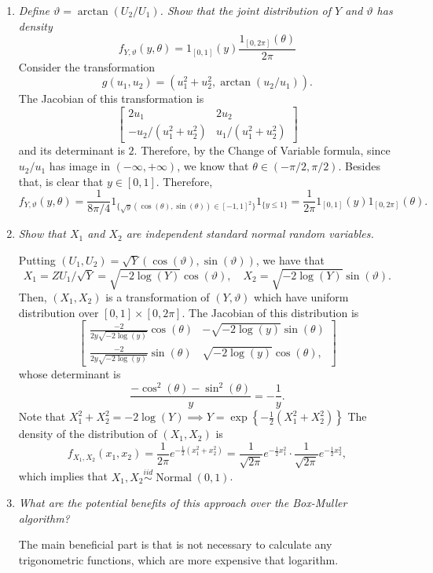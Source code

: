 \documentclass[a4paper,12pt]{article}
\theoremstyle{definition}
\begin{document}
\begin{enumerate}
    \item {\it Define $\vartheta = \arctan(U_2/U_1)$. Show that the joint
    distribution of $Y$ and $\vartheta$ has density 
    $$
    f_{Y, \vartheta}(y,\theta) = 1_{[0,1]}(y)\frac{1_{[0,2\pi]}(\theta)}{2\pi}
    $$}
    Consider the transformation
    $$
    g(u_1, u_2) = \left(u_1^2 + u_2^2, \arctan(u_2/u_1)\right).
    $$ 
    The Jacobian of this transformation is 
    $$
    \begin{bmatrix}
        2u_1 & 2u_2 \\ 
        -u_2/(u_1^2 + u_2^2) & u_1/(u_1^2 + u_2^2)
    \end{bmatrix}
    $$
    and its determinant is $2$. Therefore, by the Change of Variable formula,
    since $u_2/u_1$ has image in $(-\infty, +\infty)$, we know that $\theta \in (-\pi/2,
    \pi/2)$. Besides that, is clear that $y \in [0,1]$. Therefore, 
    $$
    f_{Y, \vartheta}(y,\theta) = \frac{1}{8\pi/4}1_{\{\sqrt{y}(\cos(\theta), \sin(\theta)) \in [-1,1]^2\}}1_{\{y \le 1\}} = \frac{1}{2\pi}1_{[0,1]}(y)1_{[0,2\pi]}(\theta).
    $$

    \item {\it Show that $X_1$ and $X_2$ are independent standard normal random variables.}
    
    Putting $(U_1, U_2) = \sqrt{Y}(\cos(\vartheta), \sin(\vartheta))$, we have
    that 
    $$X_1 = ZU_1/\sqrt{Y} = \sqrt{-2\log(Y)}\cos(\vartheta), \quad X_2 =
    \sqrt{-2\log(Y)}\sin(\vartheta).$$
    Then, $(X_1, X_2)$ is a transformation of $(Y,\vartheta)$ which have uniform
    distribution over $[0,1] \times [0, 2\pi]$. The Jacobian of this
    distribution is 
    $$
    \begin{bmatrix}
        \frac{-2}{2y\sqrt{-2\log(y)}}\cos(\theta) & -\sqrt{-2\log(y)}\sin(\theta) \\
        \frac{-2}{2y\sqrt{-2\log(y)}}\sin(\theta) & \sqrt{-2\log(y)}\cos(\theta),
    \end{bmatrix}
    $$
    whose determinant is 
    $$\frac{-\cos^2(\theta) - \sin^2(\theta)}{y} = -\frac{1}{y}.$$
    Note that $X_1^2 + X_2^2 = -2\log(Y) \implies Y =
    \exp\left\{-\frac{1}{2}(X_1^2 + X_2^2)\right\}$
     The density of the distribution of $(X_1, X_2)$ is 
    $$
    f_{X_1, X_2}(x_1, x_2) = \frac{1}{2\pi} e^{-\frac{1}{2}(x_1^2 + x_2^2)} = \frac{1}{\sqrt{2\pi}}e^{-\frac{1}{2}x_1^2} \cdot \frac{1}{\sqrt{2\pi}}e^{-\frac{1}{2}x_2^2},
    $$
    which implies that $X_1, X_2 \overset{iid}{\sim}
    \operatorname{Normal}(0,1)$.
    
    \item {\it  What are the potential benefits of this approach over the Box-Muller algorithm?}
    
    The main beneficial part is that is not necessary to calculate any
    trigonometric functions, which are more expensive that logarithm. 

\end{enumerate}
\end{document}
